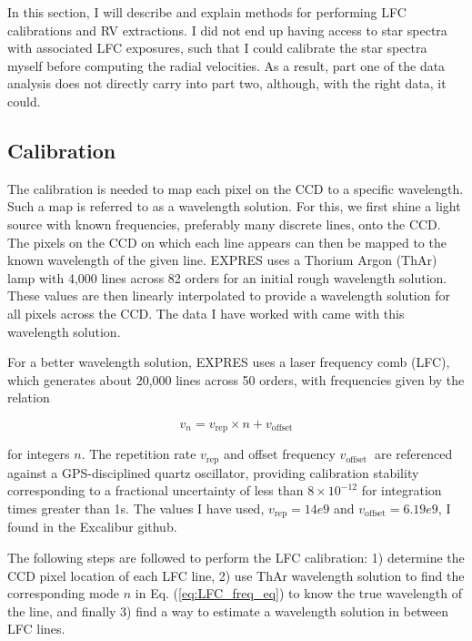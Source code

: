 In this section, I will describe and explain methods for performing LFC calibrations and RV extractions. I did not end up having access to star spectra with associated LFC exposures, such that I could calibrate the star spectra myself before computing the radial velocities. As a result, part one of the data analysis does not directly carry into part two, although, with the right data, it could.

\subsection{Calibration} 

    The calibration is needed to map each pixel on the CCD to a specific wavelength. Such a map is referred to as a wavelength solution. For this, we first shine a light source with known frequencies, preferably many discrete lines, onto the CCD. The pixels on the CCD on which each line appears can then be mapped to the known wavelength of the given line. EXPRES uses a Thorium Argon (ThAr) lamp with 4,000 lines across 82 orders for an initial rough wavelength solution. These values are then linearly interpolated to provide a wavelength solution for all pixels across the CCD. The data I have worked with came with this wavelength solution.
    
    For a better wavelength solution, EXPRES uses a laser frequency comb (LFC), which generates about 20,000 lines across 50 orders, with frequencies given by the relation

    \begin{equation}
        \label{eq:LFC_freq_eq}
        v_{n}=v_{\text{rep}} \times n+v_{\text{offset}}
    \end{equation}

    for integers $n$. The repetition rate $v_{\text {rep}}$ and offset frequency $v_{\text {offset }}$ are referenced against a GPS-disciplined quartz oscillator, providing calibration stability corresponding to a fractional uncertainty of less than $8 \times 10^{-12}$ for integration times greater than 1s\cite{first_RV_from_EXPRES}. The values I have used, $v_{\text{rep}} = 14e9$ and $v_{\text{offset}} = 6.19e9$, I found in the Excalibur github\cite{excalibur_github}.
    
    The following steps are followed to perform the LFC calibration: 1) determine the CCD pixel location of each LFC line, 2) use ThAr wavelength solution to find the corresponding mode $n$ in Eq. (\ref{eq:LFC_freq_eq}) to know the true wavelength of the line, and finally 3) find a way to estimate a wavelength solution in between LFC lines. 

